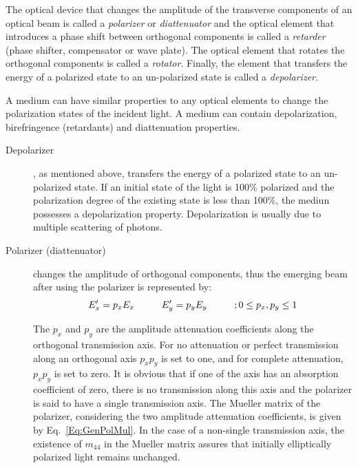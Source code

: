 The optical device that changes the amplitude of the transverse components of an optical beam is called a \textit{polarizer} or \textit{diattenuator} and the optical element that introduces a phase shift between orthogonal components is called a \textit{retarder} (phase shifter, compensator or wave plate).
The optical element that rotates the orthogonal components is called a \textit{rotator}.
Finally, the element that transfers the energy of a polarized state to an un-polarized state is called a \textit{depolarizer}. 

A medium can have similar properties to any optical elements to change the polarization states of the incident light.
A medium can contain depolarization, birefringence (retardants) and diattenuation properties. 

\begin{description}
\item [Depolarizer], as mentioned above, transfers the energy of a polarized state to an un-polarized state.
If an initial state of the light is 100$\%$ polarized and the polarization degree of the existing state is less than 100$\%$, the mediun possesses a depolarization property.
Depolarization is usually due to multiple scattering of photons.

\item[Polarizer (diattenuator)] changes the amplitude of orthogonal components, thus the emerging beam after using the polarizer is represented by:
\begin{equation}\label{Eq:Pol}
\small
	E'_{x} = p_{x}E_{x}   \hspace{1 cm}	E'_{y} = p_{y}E_{y} \hspace{1 cm} ; 0 \leq p_{x}, p_{y}\leq 1
\end{equation}

\noindent The $p_{x}$ and $p_{y}$ are the amplitude attenuation coefficients along the orthogonal transmission axis.
For no attenuation or perfect transmission along an orthogonal axis $p_{x}p_{y}$ is set to one, and for complete attenuation, $p_{x}p_{y}$ is set to zero.
It is obvious that if one of the axis has an absorption coefficient of zero, there is no transmission along this axis and the polarizer is said to have a single transmission axis.
The Mueller matrix of the polarizer, considering the two amplitude attenuation coefficients, is given by Eq.~\ref{Eq:GenPolMul}.
In the case of a non-single transmission axis, the existence of $m_{44}$ in the Mueller matrix assures that initially elliptically polarized light remains unchanged.


\end{description}
